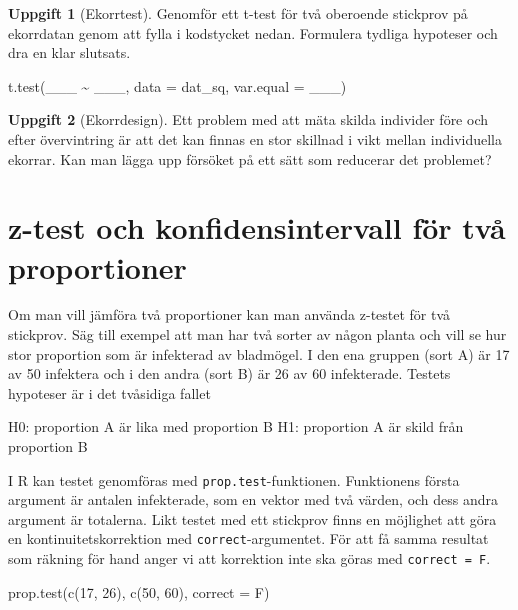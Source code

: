 \documentclass[
]{book}
\newenvironment{Shaded}{\begin{snugshade}}{\end{snugshade}}
\newcommand{\AttributeTok}[1]{\textcolor[rgb]{0.77,0.63,0.00}{#1}}
\newcommand{\DecValTok}[1]{\textcolor[rgb]{0.00,0.00,0.81}{#1}}
\newcommand{\FunctionTok}[1]{\textcolor[rgb]{0.00,0.00,0.00}{#1}}
\newcommand{\NormalTok}[1]{#1}
\newcommand{\SpecialCharTok}[1]{\textcolor[rgb]{0.00,0.00,0.00}{#1}}
\theoremstyle{definition}
\theoremstyle{definition}
\theoremstyle{definition}
\newtheorem{exercise}{Uppgift}[chapter]
\theoremstyle{definition}
\theoremstyle{remark}
\begin{document}
\begin{exercise}[Ekorrtest]

Genomför ett t-test för två oberoende stickprov på ekorrdatan genom att fylla i kodstycket nedan. Formulera tydliga hypoteser och dra en klar slutsats.

\begin{Shaded}
\begin{Highlighting}[]
\FunctionTok{t.test}\NormalTok{(\_\_\_ }\SpecialCharTok{\textasciitilde{}}\NormalTok{ \_\_\_, }\AttributeTok{data =}\NormalTok{ dat\_sq, }\AttributeTok{var.equal =}\NormalTok{ \_\_\_)}
\end{Highlighting}
\end{Shaded}

\end{exercise}

\begin{exercise}[Ekorrdesign]
Ett problem med att mäta skilda individer före och efter övervintring är att det kan finnas en stor skillnad i vikt mellan individuella ekorrar. Kan man lägga upp försöket på ett sätt som reducerar det problemet?
\end{exercise}

\hypertarget{z-test-och-konfidensintervall-fuxf6r-tvuxe5-proportioner}{%
\section{z-test och konfidensintervall för två proportioner}\label{z-test-och-konfidensintervall-fuxf6r-tvuxe5-proportioner}}

Om man vill jämföra två proportioner kan man använda z-testet för två stickprov. Säg till exempel att man har två sorter av någon planta och vill se hur stor proportion som är infekterad av bladmögel. I den ena gruppen (sort A) är 17 av 50 infektera och i den andra (sort B) är 26 av 60 infekterade. Testets hypoteser är i det tvåsidiga fallet

H0: proportion A är lika med proportion B
H1: proportion A är skild från proportion B

I R kan testet genomföras med \texttt{prop.test}-funktionen. Funktionens första argument är antalen infekterade, som en vektor med två värden, och dess andra argument är totalerna. Likt testet med ett stickprov finns en möjlighet att göra en kontinuitetskorrektion med \texttt{correct}-argumentet. För att få samma resultat som räkning för hand anger vi att korrektion inte ska göras med \texttt{correct\ =\ F}.

\begin{Shaded}
\begin{Highlighting}[]
\FunctionTok{prop.test}\NormalTok{(}\FunctionTok{c}\NormalTok{(}\DecValTok{17}\NormalTok{, }\DecValTok{26}\NormalTok{), }\FunctionTok{c}\NormalTok{(}\DecValTok{50}\NormalTok{, }\DecValTok{60}\NormalTok{), }\AttributeTok{correct =}\NormalTok{ F)}
\end{Highlighting}
\end{Shaded}
\end{document}

